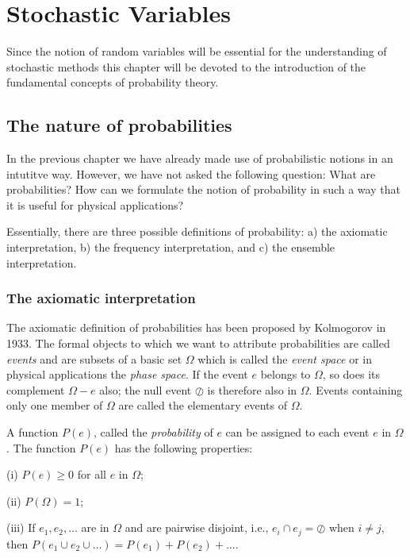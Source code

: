 
\chapter{Stochastic Variables}
Since the notion of random variables will be essential
for the understanding of stochastic methods this chapter will be 
devoted to the introduction of the fundamental concepts of 
probability theory.

\section{The nature of probabilities}
In the previous chapter we have already made use of probabilistic 
notions in an intutitve way. However, we have not asked the 
following question: What are probabilities? How can we formulate 
the notion of probability in such a way that it is useful for 
physical applications?

Essentially, there are three possible definitions of probability:
a) the axiomatic interpretation, b) the frequency interpretation, and
c) the ensemble interpretation.


\subsection{The axiomatic interpretation}
The axiomatic definition of probabilities has been proposed by 
Kolmogorov in 1933. The formal objects to which we want to 
attribute probabilities are called {\em events} and are subsets
of a basic set $\Omega$ which is called the {\em event space} or in 
physical applications the {\em phase space}. If the event $e$ 
belongs to $\Omega$, so does its complement $\Omega - e$ also; the 
null event $\oslash$ is therefore also in $\Omega$. Events 
containing only one member of $\Omega$ are called the elementary events
of $\Omega$.

A function $P(e)$, called the {\em probability} of $e$ can be 
assigned to each event $e$ in $\Omega$. The function $P(e)$ has
the following properties:

(i) $P(e) \ge 0$ for all $e$ in $\Omega$;

(ii) $P(\Omega) = 1$;

(iii) If $e_1, e_2, \ldots $ are in $\Omega$ and are pairwise
disjoint, i.e., $e_i \cap e_j = \oslash$ when $i \ne j$, then
$P(e_1 \cup e_2 \cup \ldots ) = P(e_1)+P(e_2) + \ldots$.

